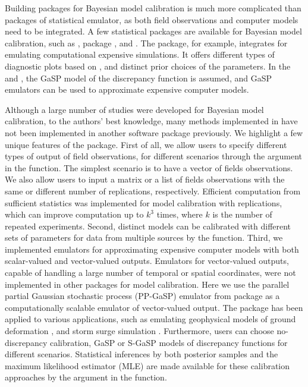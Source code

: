 Building packages for Bayesian model calibration is much more complicated than packages of statistical emulator, as both field observations and computer models {need to be} integrated.  A few statistical packages are available for Bayesian model calibration, such as  \citep{hankin2005introducing},   package \citep{palomo2015save}, and  \citep{carmassi2018calico}. The  package, for example, integrates    for emulating computational expensive simulations. It offers different types of diagnostic plots based on  \citep{wickham2011ggplot2}, and {distinct} prior choices of the parameters. In the  and , the GaSP model of the discrepancy function \citep{kennedy2001bayesian} { is assumed, and GaSP emulators can  be used to approximate  expensive computer models}. 

Although a large number of studies were developed for Bayesian model calibration, to the authors' best knowledge, many methods implemented in  have not been implemented in another software package previously. We highlight a few unique features of the  package. First of all, we allow users to specify different types of output of field observations, for different scenarios through the  argument in the  function. The simplest scenario is to have a vector of fields observations. We also allow users to input a matrix  or a list of fields observations with the same or different number of replications, respectively. Efficient computation from  sufficient statistics was implemented for model calibration with replications, which can improve computation up to $k^3$ times, where $k$ is the number of repeated experiments. Second, {distinct models can be calibrated with different sets of parameters for data from multiple sources by the   function}. %
Third, we implemented  emulators for approximating expensive computer models with both scalar-valued  and vector-valued outputs.  Emulators for vector-valued outputs, capable of handling a large number of temporal or spatial coordinates, were not implemented in other packages for  model calibration. Here we use the parallel partial Gaussian stochastic process  (PP-GaSP) emulator from  package \citep{gu2018robustgasp} as a computationally scalable emulator of vector-valued output. The   package has been applied to various applications, such as emulating geophysical models of ground deformation   \citep{anderson2019magma}, and storm surge simulation \citep{ma2022multifidelity}. 
{Furthermore, users can choose no-discrepancy calibration,  GaSP or S-GaSP models of discrepancy functions for different scenarios. Statistical inferences by both posterior samples and the maximum likelihood estimator (MLE) are  made available for these calibration approaches by the  argument in the  function. }



